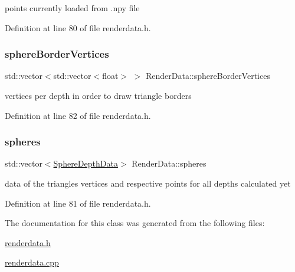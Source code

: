points currently loaded from .npy file 



Definition at line 80 of file renderdata.\+h.

\mbox{\label{class_render_data_aadf6eefa26ab7f440571b651d38d6e0e}} 
\subsubsection{\texorpdfstring{sphere\+Border\+Vertices}{sphereBorderVertices}}
{\footnotesize\ttfamily std\+::vector$<$std\+::vector$<$float$>$ $>$ Render\+Data\+::sphere\+Border\+Vertices\hspace{0.3cm}{\ttfamily [private]}}



vertices per depth in order to draw triangle borders 



Definition at line 82 of file renderdata.\+h.

\mbox{\label{class_render_data_af8d7292450ad6bba825a6dbb75be217c}} 
\subsubsection{\texorpdfstring{spheres}{spheres}}
{\footnotesize\ttfamily std\+::vector$<$\hyperlink{struct_sphere_depth_data}{Sphere\+Depth\+Data}$>$ Render\+Data\+::spheres\hspace{0.3cm}{\ttfamily [private]}}



data of the triangles\textquotesingle{} vertices and respective points for all depths calculated yet 



Definition at line 81 of file renderdata.\+h.



The documentation for this class was generated from the following files\+:\begin{DoxyCompactItemize}
\item 
\hyperlink{renderdata_8h}{renderdata.\+h}\item 
\hyperlink{renderdata_8cpp}{renderdata.\+cpp}\end{DoxyCompactItemize}
